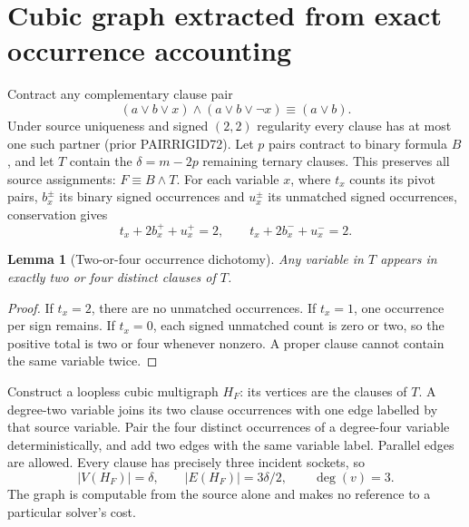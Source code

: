 \documentclass[11pt]{article}
\newtheorem{lemma}{Lemma}
\begin{document}
\section{Cubic graph extracted from exact occurrence accounting}
Contract any complementary clause pair
\[
(a\vee b\vee x)\wedge(a\vee b\vee\neg x)\equiv(a\vee b).
\]
Under source uniqueness and signed $(2,2)$ regularity every clause has at most one such partner (prior PAIRRIGID72). Let $p$ pairs contract to binary formula $B$, and let $T$ contain the $\delta=m-2p$ remaining ternary clauses. This preserves all source assignments: $F\equiv B\wedge T$. For each variable $x$, where $t_x$ counts its pivot pairs, $b_x^\pm$ its binary signed occurrences and $u_x^\pm$ its unmatched signed occurrences, conservation gives
\[
t_x+2b_x^++u_x^+=2,\qquad t_x+2b_x^-+u_x^-=2.
\]
\begin{lemma}[Two-or-four occurrence dichotomy]
Any variable in $T$ appears in exactly two or four \emph{distinct} clauses of $T$.
\end{lemma}
\begin{proof}
If $t_x=2$, there are no unmatched occurrences. If $t_x=1$, one occurrence per sign remains. If $t_x=0$, each signed unmatched count is zero or two, so the positive total is two or four whenever nonzero. A proper clause cannot contain the same variable twice.
\end{proof}
Construct a loopless cubic multigraph $H_F$: its vertices are the clauses of $T$. A degree-two variable joins its two clause occurrences with one edge labelled by that source variable. Pair the four distinct occurrences of a degree-four variable deterministically, and add two edges with the same variable label. Parallel edges are allowed. Every clause has precisely three incident sockets, so
\[
|V(H_F)|=\delta,\qquad |E(H_F)|=3\delta/2,\qquad \deg(v)=3.
\]
The graph is computable from the source alone and makes no reference to a particular solver's cost.
\end{document}
